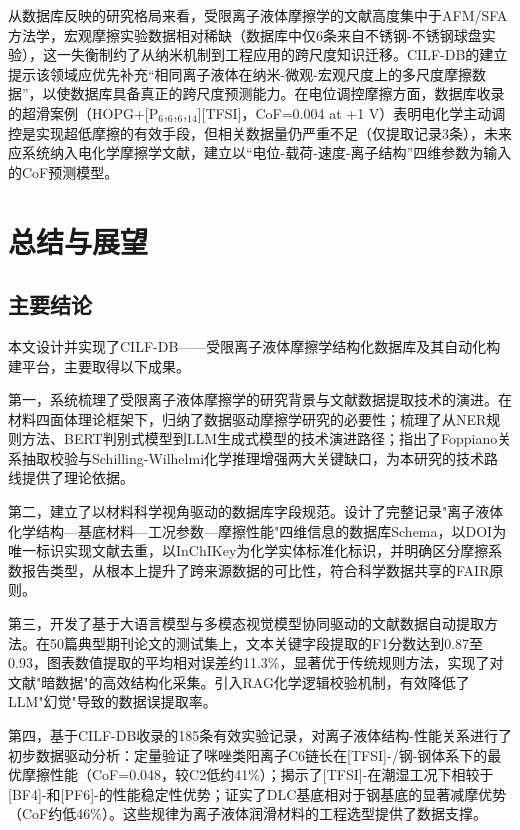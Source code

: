 从数据库反映的研究格局来看，受限离子液体摩擦学的文献高度集中于AFM/SFA方法学，宏观摩擦实验数据相对稀缺（数据库中仅6条来自不锈钢-不锈钢球盘实验），这一失衡制约了从纳米机制到工程应用的跨尺度知识迁移。CILF-DB的建立提示该领域应优先补充``相同离子液体在纳米-微观-宏观尺度上的多尺度摩擦数据''，以使数据库具备真正的跨尺度预测能力。在电位调控摩擦方面，数据库收录的超滑案例（HOPG+{[}P$_{6}$,$_{6}$,$_{6}$,$_{14}${]}{[}TFSI{]}，CoF=0.004 at +1 V）表明电化学主动调控是实现超低摩擦的有效手段，但相关数据量仍严重不足（仅提取记录3条），未来应系统纳入电化学摩擦学文献，建立以``电位-载荷-速度-离子结构''四维参数为输入的CoF预测模型。

\hypertarget{ux603bux7ed3ux4e0eux5c55ux671b}{%
\section{总结与展望}\label{ux603bux7ed3ux4e0eux5c55ux671b}}

\hypertarget{ux4e3bux8981ux7ed3ux8bba}{%
\subsection{主要结论}\label{ux4e3bux8981ux7ed3ux8bba}}

本文设计并实现了CILF-DB------受限离子液体摩擦学结构化数据库及其自动化构建平台，主要取得以下成果。

第一，系统梳理了受限离子液体摩擦学的研究背景与文献数据提取技术的演进。在材料四面体理论框架下，归纳了数据驱动摩擦学研究的必要性；梳理了从NER规则方法、BERT判别式模型到LLM生成式模型的技术演进路径；指出了Foppiano关系抽取校验与Schilling-Wilhelmi化学推理增强两大关键缺口，为本研究的技术路线提供了理论依据\cite{ref17,ref19}。

第二，建立了以材料科学视角驱动的数据库字段规范。设计了完整记录"离子液体化学结构---基底材料---工况参数---摩擦性能"四维信息的数据库Schema，以DOI为唯一标识实现文献去重，以InChIKey为化学实体标准化标识，并明确区分摩擦系数报告类型，从根本上提升了跨来源数据的可比性，符合科学数据共享的FAIR原则。

第三，开发了基于大语言模型与多模态视觉模型协同驱动的文献数据自动提取方法。在50篇典型期刊论文的测试集上，文本关键字段提取的F1分数达到0.87至0.93，图表数值提取的平均相对误差约11.3\%，显著优于传统规则方法，实现了对文献"暗数据"的高效结构化采集。引入RAG化学逻辑校验机制，有效降低了LLM"幻觉"导致的数据误提取率\cite{ref17,ref19,ref29}。

第四，基于CILF-DB收录的185条有效实验记录，对离子液体结构-性能关系进行了初步数据驱动分析：定量验证了咪唑类阳离子C6链长在{[}TFSI{]}-/钢-钢体系下的最优摩擦性能（CoF=0.048，较C2低约41\%）；揭示了{[}TFSI{]}-在潮湿工况下相较于{[}BF4{]}-和{[}PF6{]}-的性能稳定性优势；证实了DLC基底相对于钢基底的显著减摩优势（CoF约低46\%）。这些规律为离子液体润滑材料的工程选型提供了数据支撑\cite{ref25,ref26,ref27}。

